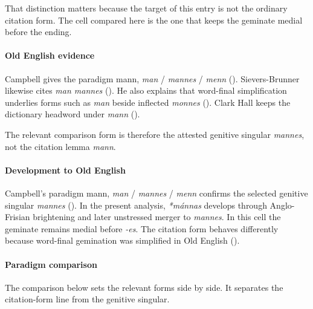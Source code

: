\documentclass[
  british,
  a4paper,
]{article}
\begin{document}
That distinction matters because the target of this entry is not the
ordinary citation form. The cell compared here is the one that keeps the
geminate medial before the ending.

\paragraph{Old English evidence}\label{old-english-evidence-49}

Campbell gives the paradigm mann, \emph{man} / \emph{mannes} /
\emph{menn} ().
Sievers-Brunner likewise cites \emph{man mannes}
(). He also
explains that word-final simplification underlies forms such as
\emph{man} beside inflected \emph{monnes}
(). Clark Hall
keeps the dictionary headword under \emph{mann}
().

The relevant comparison form is therefore the attested genitive singular
\emph{mannes}, not the citation lemma \emph{mann}.

\paragraph{Development to Old
English}\label{development-to-old-english-49}

Campbell's paradigm mann, \emph{man} / \emph{mannes} / \emph{menn}
confirms the selected genitive singular \emph{mannes}
(). In the present
analysis, \emph{*mánnas} develops through Anglo-Frisian brightening and
later unstressed merger to \emph{mannes}. In this cell the geminate
remains medial before \emph{-es}. The citation form behaves differently
because word-final gemination was simplified in Old English
().

\paragraph{Paradigm comparison}\label{paradigm-comparison-10}

The comparison below sets the relevant forms side by side. It separates
the citation-form line from the genitive singular.
\end{document}

